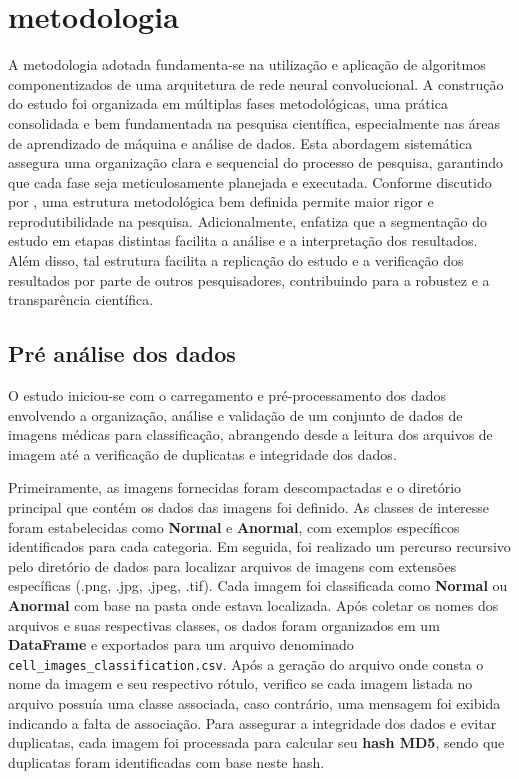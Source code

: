 \chapter{metodologia}\label{chapter:metodologia}

A metodologia adotada fundamenta-se na utilização e aplicação de algoritmos componentizados de uma arquitetura de rede neural convolucional. A construção do estudo foi organizada em múltiplas fases metodológicas, uma prática consolidada e bem fundamentada na pesquisa científica, especialmente nas áreas de aprendizado de máquina e análise de dados. Esta abordagem sistemática assegura uma organização clara e sequencial do processo de pesquisa, garantindo que cada fase seja meticulosamente planejada e executada. Conforme discutido por \cite{creswell}, uma estrutura metodológica bem definida permite maior rigor e reprodutibilidade na pesquisa. Adicionalmente, \cite{yin} enfatiza que a segmentação do estudo em etapas distintas facilita a análise e a interpretação dos resultados. Além disso, tal estrutura facilita a replicação do estudo e a verificação dos resultados por parte de outros pesquisadores, contribuindo para a robustez e a transparência científica.

\section{Pré análise dos dados}

O estudo iniciou-se com o carregamento e pré-processamento dos dados envolvendo a organização, análise e validação de um conjunto de dados de imagens médicas para classificação, abrangendo desde a leitura dos arquivos de imagem até a verificação de duplicatas e integridade dos dados.

Primeiramente, as imagens fornecidas foram descompactadas e o diretório principal que contém os dados das imagens foi definido. As classes de interesse foram estabelecidas como \textbf{Normal} e \textbf{Anormal}, com exemplos específicos identificados para cada categoria. Em seguida, foi realizado um percurso recursivo pelo diretório de dados para localizar arquivos de imagens com extensões específicas (.png, .jpg, .jpeg, .tif). Cada imagem foi classificada como \textbf{Normal} ou \textbf{Anormal} com base na pasta onde estava localizada. Após coletar os nomes dos arquivos e suas respectivas classes, os dados foram organizados em um \textbf{DataFrame} e exportados para um arquivo denominado \texttt{cell\_images\_classification.csv}. Após a geração do arquivo onde consta o nome da imagem e seu respectivo rótulo, verifico se cada imagem listada no arquivo possuía uma classe associada, caso contrário, uma mensagem foi exibida indicando a falta de associação. Para assegurar a integridade dos dados e evitar duplicatas, cada imagem foi processada para calcular seu \textbf{hash MD5}, sendo que duplicatas foram identificadas com base neste hash.

